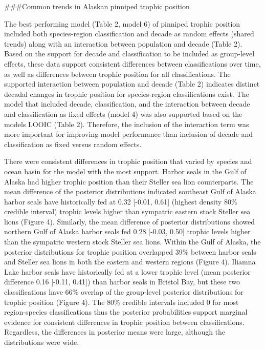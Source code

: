 \documentclass [11pt, proquest] {uwthesis}[2015/03/03]
\begin{document}
\#\#\#Common trends in Alaskan pinniped trophic position

The best performing model (Table 2, model 6) of pinniped trophic position included both species-region classification and decade as random effects (shared trends) along with an interaction between population and decade (Table 2). Based on the support for decade and classification to be included as group-level effects, these data support consistent differences between classifications over time, as well as differences between trophic position for all classifications. The supported interaction between population and decade (Table 2) indicates distinct decadal changes in trophic position for species-region classifications exist. The model that included decade, classification, and the interaction between decade and classification as fixed effects (model 4) was also supported based on the models LOOIC (Table 2). Therefore, the inclusion of the interaction term was more important for improving model performance than inclusion of decade and classification as fixed versus random effects.

There were consistent differences in trophic position that varied by species and ocean basin for the model with the most support. Harbor seals in the Gulf of Alaska had higher trophic position than their Steller sea lion counterparts. The mean difference of the posterior distributions indicated southeast Gulf of Alaska harbor seals have historically fed at 0.32 {[}-0.01, 0.61{]} (highest density 80\% credible interval) trophic levels higher than sympatric eastern stock Steller sea lions (Figure 4). Similarly, the mean difference of posterior distributions showed northern Gulf of Alaska harbor seals fed 0.28 {[}-0.03, 0.50{]} trophic levels higher than the sympatric western stock Steller sea lions. Within the Gulf of Alaska, the posterior distributions for trophic position overlapped 39\% between harbor seals and Steller sea lions in both the eastern and western regions (Figure 4). Iliamna Lake harbor seals have historically fed at a lower trophic level (mean posterior difference 0.16 {[}-0.11, 0.41{]}) than harbor seals in Bristol Bay, but these two classifications have 66\% overlap of the group-level posterior distributions for trophic position (Figure 4). The 80\% credible intervals included 0 for most region-species classifications thus the posterior probabilities support marginal evidence for consistent differences in trophic position between classifications. Regardless, the differences in posterior means were large, although the distributions were wide.
\end{document}
